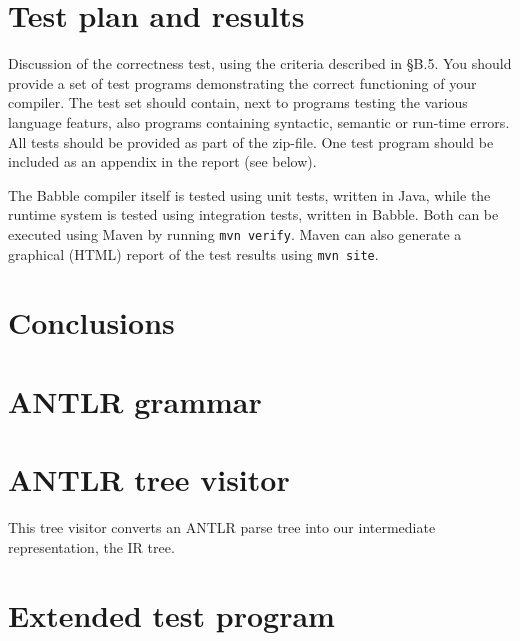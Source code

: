 \documentclass[a4paper]{article}
\begin{document}
\section{Test plan and results}
Discussion of the correctness test, using the criteria described in §B.5. You
should provide a set of test programs demonstrating the correct functioning of your compiler. The test
set should contain, next to programs testing the various language featurs, also programs containing
syntactic, semantic or run-time errors.
All tests should be provided as part of the zip-file. One test program should be included as an appendix
in the report (see below).


The Babble compiler itself is tested using unit tests, written in Java, while the runtime system is tested using integration tests, written in Babble.
Both can be executed using Maven by running \texttt{mvn verify}.
Maven can also generate a graphical (HTML) report of the test results using \texttt{mvn site}.


\section{Conclusions}

\clearpage

\begin{appendices}

\label{grammar}
\section{ANTLR grammar}



\label{visitor}
\section{ANTLR tree visitor}
This tree visitor converts an ANTLR parse tree into our intermediate representation, the IR tree.



\section{Extended test program}



\end{appendices}
\end{document}
